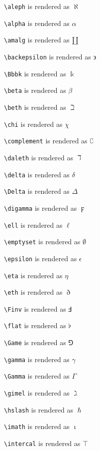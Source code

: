 \texttt{\textbackslash aleph} is rendered as $\aleph$


\texttt{\textbackslash alpha} is rendered as $\alpha$


\texttt{\textbackslash amalg} is rendered as $\amalg$


\texttt{\textbackslash backepsilon} is rendered as $\backepsilon$


\texttt{\textbackslash Bbbk} is rendered as $\Bbbk$


\texttt{\textbackslash beta} is rendered as $\beta$


\texttt{\textbackslash beth} is rendered as $\beth$


\texttt{\textbackslash chi} is rendered as $\chi$


\texttt{\textbackslash complement} is rendered as $\complement$


\texttt{\textbackslash daleth} is rendered as $\daleth$


\texttt{\textbackslash delta} is rendered as $\delta$


\texttt{\textbackslash Delta} is rendered as $\Delta$


\texttt{\textbackslash digamma} is rendered as $\digamma$


\texttt{\textbackslash ell} is rendered as $\ell$


\texttt{\textbackslash emptyset} is rendered as $\emptyset$


\texttt{\textbackslash epsilon} is rendered as $\epsilon$


\texttt{\textbackslash eta} is rendered as $\eta$


\texttt{\textbackslash eth} is rendered as $\eth$


\texttt{\textbackslash Finv} is rendered as $\Finv$


\texttt{\textbackslash flat} is rendered as $\flat$


\texttt{\textbackslash Game} is rendered as $\Game$


\texttt{\textbackslash gamma} is rendered as $\gamma$


\texttt{\textbackslash Gamma} is rendered as $\Gamma$


\texttt{\textbackslash gimel} is rendered as $\gimel$


\texttt{\textbackslash hslash} is rendered as $\hslash$


\texttt{\textbackslash imath} is rendered as $\imath$


\texttt{\textbackslash intercal} is rendered as $\intercal$


